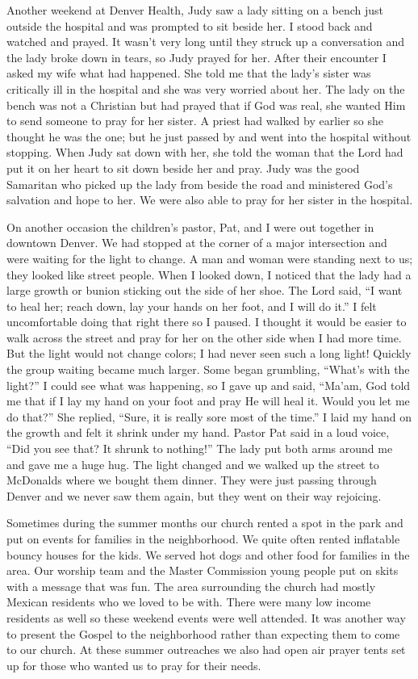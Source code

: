 \documentclass[twoside, 12pt]{book}
\begin{document}
Another weekend at Denver Health, Judy saw a lady sitting on a bench just outside the hospital and was prompted to sit beside her. I stood back and watched and prayed. It wasn’t very long until they struck up a conversation and the lady broke down in tears, so Judy prayed for her. After their encounter I asked my wife what had happened. She told me that the lady’s sister was critically ill in the hospital and she was very worried about her. The lady on the bench was not a Christian but had prayed that if God was real, she wanted Him to send someone to pray for her sister. A priest had walked by earlier so she thought he was the one; but he just passed by and went into the hospital without stopping. When Judy sat down with her, she told the woman that the Lord had put it on her heart to sit down beside her and pray. Judy was the good Samaritan who picked up the lady from beside the road and ministered God’s salvation and hope to her. We were also able to pray for her sister in the hospital. 

On another occasion the children’s pastor, Pat, and I were out together in downtown Denver. We had stopped at the corner of a major intersection and were waiting for the light to change. A man and woman were standing next to us; they looked like street people. When I looked down, I noticed that the lady had a large growth or bunion sticking out the side of her shoe. The Lord said, “I want to heal her; reach down, lay your hands on her foot, and I will do it.” I felt uncomfortable doing that right there so I paused. I thought it would be easier to walk across the street and pray for her on the other side when I had more time. But the light would not change colors; I had never seen such a long light! Quickly the group waiting became much larger. Some began grumbling, “What’s with the light?” I could see what was happening, so I gave up and said, “Ma’am, God told me that if I lay my hand on your foot and pray He will heal it. Would you let me do that?” She replied, “Sure, it is really sore most of the time.” I laid my hand on the growth and felt it shrink under my hand. Pastor Pat said in a loud voice, “Did you see that? It shrunk to nothing!” The lady put both arms around me and gave me a huge hug. The light changed and we walked up the street to McDonalds where we bought them dinner. They were just passing through Denver and we never saw them again, but they went on their way rejoicing.

Sometimes during the summer months our church rented a spot in the park and put on events for families in the neighborhood. We quite often rented inflatable bouncy houses for the kids. We served hot dogs and other food for families in the area. Our worship team and the Master Commission young people put on skits with a message that was fun. The area surrounding the church had mostly Mexican residents who we loved to be with. There were many low income residents as well so these weekend events were well attended. It was another way to present the Gospel to the neighborhood rather than expecting them to come to our church. At these summer outreaches we also had open air prayer tents set up for those who wanted us to pray for their needs. 
\end{document}
